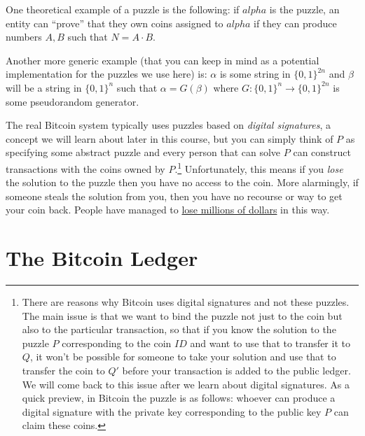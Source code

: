 
One theoretical example of a puzzle is the following: if \(alpha\) is
the puzzle, an entity can ``prove'' that they own coins assigned to
\(alpha\) if they can produce numbers \(A,B\) such that \(N=A\cdot B\).

Another more generic example (that you can keep in mind as a potential
implementation for the puzzles we use here) is: \(\alpha\) is some
string in \(\{0,1\}^{2n}\) and \(\beta\) will be a string in
\(\{0,1\}^n\) such that \(\alpha = G(\beta)\) where
\(G:\{0,1\}^n\rightarrow\{0,1\}^{2n}\) is some pseudorandom generator.

The real Bitcoin system typically uses puzzles based on \emph{digital
signatures}, a concept we will learn about later in this course, but you
can simply think of \(P\) as specifying some abstract puzzle and every
person that can solve \(P\) can construct transactions with the coins
owned by \(P\).\footnote{There are reasons why Bitcoin uses digital
  signatures and not these puzzles. The main issue is that we want to
  bind the puzzle not just to the coin but also to the particular
  transaction, so that if you know the solution to the puzzle \(P\)
  corresponding to the coin \(\ensuremath{\mathit{ID}}\) and want to use
  that to transfer it to \(Q\), it won't be possible for someone to take
  your solution and use that to transfer the coin to \(Q'\) before your
  transaction is added to the public ledger. We will come back to this
  issue after we learn about digital signatures. As a quick preview, in
  Bitcoin the puzzle is as follows: whoever can produce a digital
  signature with the private key corresponding to the public key \(P\)
  can claim these coins.} Unfortunately, this means if you \emph{lose}
the solution to the puzzle then you have no access to the coin. More
alarmingly, if someone steals the solution from you, then you have no
recourse or way to get your coin back. People have managed to
\href{http://readwrite.com/2014/01/13/what-happens-to-lost-Bitcoins}{lose
millions of dollars} in this way.

\section{The Bitcoin Ledger}\label{The-Bitcoin-Ledger}

